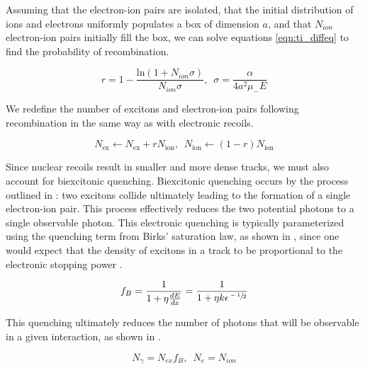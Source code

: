 Assuming that the electron-ion pairs are isolated, that the initial distribution of ions and electrons uniformly populates a box of dimension $a$, and that $N_{ion}$ electron-ion pairs initially fill the box, we can solve equations \ref{eqn:ti_diffeq} to find the probability of recombination.

\begin{equation}
        \label{eqn:ti_recomb}
        r = 1 - \frac{\textrm{ln}(1 + N_{ion} \sigma)}{N_{ion} \sigma}, \, \, \, \sigma = \frac{\alpha}{4 a^2 \mu_- E}
\end{equation}

We redefine the number of excitons and electron-ion pairs following recombination in the same way as with electronic recoils.

\begin{equation}
        N_{\textrm{ex}} \leftarrow N_{\textrm{ex}} + r N_{\textrm{ion}}, \, \, \, N_{\textrm{ion}} \leftarrow (1 - r) N_{\textrm{ion}}
\end{equation}

Since nuclear recoils result in smaller and more dense tracks, we must also account for biexcitonic quenching.  Biexcitonic quenching occurs by the process outlined in : two excitons collide ultimately leading to the formation of a single electron-ion pair.  This process effectively reduces the two potential photons to a single observable photon.  This electronic quenching is typically parameterized using the quenching term from Birks' saturation law, as shown in , since one would expect that the density of excitons in a track to be proportional to the electronic stopping power \cite{mei2008model, tretyak2010semi, bezrukov2011interplay}. 

\begin{equation}
        \label{eqn:birks_quenching}
        f_B = \frac{1}{1 + \eta \frac{dE}{dx}} = \frac{1}{1 + \eta k \epsilon^{\sfrac{-1}{2}}}
\end{equation}

This quenching ultimately reduces the number of photons that will be observable in a given interaction, as shown in .

\begin{equation}
        \label{eqn:nr_observables}
        N_{\gamma} = N_{ex} f_B, \, \, \, N_e = N_{ion}
\end{equation}




